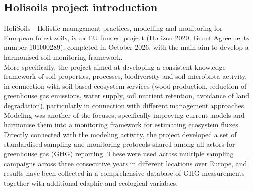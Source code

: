 \documentclass[12pt,a4paper]{article}
\begin{document}
\subsection{Holisoils project introduction}

HoliSoils - Holistic management practices, modelling and monitoring for European forest soils, is an EU funded project (Horizon 2020, Grant Agreements number 101000289), completed in October 2026, with the main aim to develop a harmonised soil monitoring framework.\\
More specifically, the project aimed at developing a consistent knowledge framework of  soil properties, processes, biodiversity and soil microbiota activity, in connection with soil-based ecosystem services (wood production, reduction of greenhouse gas emissions, water supply, soil nutrient retention, avoidance of land degradation), particularly in connection with different management approaches.
Modeling was another of the focuses, specifically improving current models and harmonise them into a monitoring framework for estimating ecosystem fluxes. Directly connected with the modeling activity, the project developed a set of standardised sampling and monitoring protocols shared among all actors for greenhouse gas (GHG) reporting. These were used across multiple sampling campaigns across three consecutive years in different locations over Europe, and results have been collected in a comprehensive database of GHG measurements together with additional edaphic and ecological variables.
\end{document}
